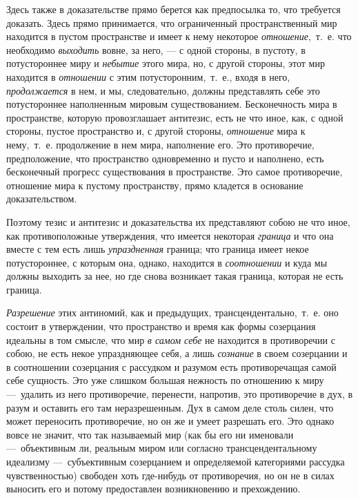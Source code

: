 Здесь также в доказательстве прямо берется как предпосылка то, что требуется
доказать. Здесь прямо принимается, что ограниченный пространственный мир
находится в пустом пространстве и имеет к нему некоторое
{\em отношение},~т.~е. что необходимо
{\em выходить} вовне, за него, — с одной стороны, в
пустоту, в потустороннее миру и {\em небытие} этого
мира, но, с другой стороны, этот мир находится в
{\em отношении} с этим потусторонним,~т.~е., входя в
него, {\em продолжается} в нем, и мы, следовательно,
должны представлять себе это потустороннее наполненным мировым
существованием. Бесконечность мира в пространстве, которую провозглашает
антитезис, есть не что иное, как, с одной стороны, пустое пространство и, с
другой стороны, {\em отношение} мира к нему,~т.~е.
продолжение в нем мира, наполнение его. Это противоречие, предположение,
что пространство одновременно и пусто и наполнено, есть бесконечный
прогресс существования в пространстве. Это самое противоречие, отношение
мира к пустому пространству, прямо кладется в основание доказательством.

Поэтому тезис и антитезис и доказательства их представляют собою не что
иное, как противоположные утверждения, что имеется некоторая
{\em граница} и что она вместе с тем есть лишь
{\em упраздненная} граница; что граница имеет некое
потустороннее, с которым она, однако, находится в
{\em соотношении} и куда мы должны выходить за нее, но
где снова возникает такая граница, которая не есть граница.

{\em Разрешение} этих антиномий, как и предыдущих,
трансцендентально,~т.~е. оно состоит в утверждении, что пространство и
время как формы созерцания идеальны в том смысле, что мир
{\em в самом себе} не находится в противоречии с собою,
не есть некое упраздняющее себя, а лишь {\em сознание}
в своем созерцании и в соотношении созерцания с рассудком и разумом есть
противоречащая самой себе сущность. Это уже слишком большая нежность по
отношению к миру —~удалить из него противоречие, перенести, напротив, это
противоречие в дух, в разум и оставить его там неразрешенным. Дух в самом
деле столь силен, что может переносить противоречие, но он же и умеет
разрешать его. Это однако вовсе не значит, что так называемый мир (как бы
его ни именовали —~объективным ли, реальным миром или согласно
трансцендентальному идеализму —~субъективным созерцанием и определяемой
категориями рассудка чувственностью) свободен хоть где-нибудь от
противоречия, но он не в силах выносить его и потому предоставлен
возникновению и прехождению.

